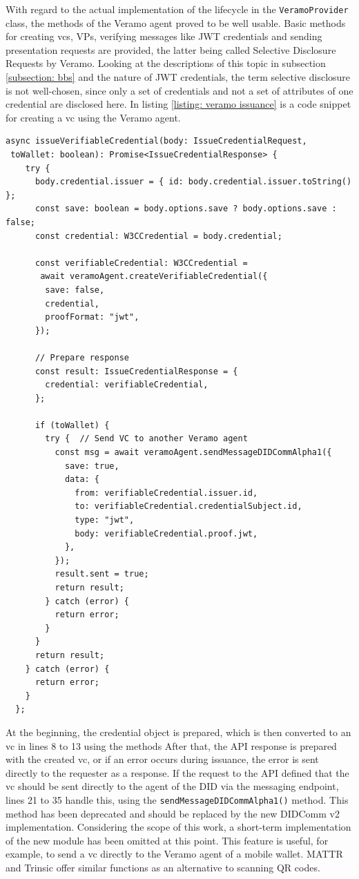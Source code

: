    With regard to the actual implementation of the lifecycle in the \texttt{VeramoProvider} class, the methods of the Veramo agent proved to be well usable. Basic methods for creating \acp{vc}, \acp{VP}, verifying messages like JWT credentials and sending presentation requests are provided, the latter being called Selective Disclosure Requests by Veramo. Looking at the descriptions of this topic in subsection \ref{subsection: bbs} and the nature of JWT credentials, the term selective disclosure is not well-chosen, since only a set of credentials and not a set of attributes of one credential are disclosed here. In listing \ref{listing: veramo issuance} is a code snippet for creating a \ac{vc} using the Veramo agent.
    \newline
        \begin{lstlisting}[style=ES6, caption=Issue a \ac{vc} with Veramo, label={listing: veramo issuance}]
async issueVerifiableCredential(body: IssueCredentialRequest, 
 toWallet: boolean): Promise<IssueCredentialResponse> {
    try {
      body.credential.issuer = { id: body.credential.issuer.toString() };
      const save: boolean = body.options.save ? body.options.save : false;
      const credential: W3CCredential = body.credential;
      
      const verifiableCredential: W3CCredential = 
       await veramoAgent.createVerifiableCredential({
        save: false,
        credential,
        proofFormat: "jwt",
      });

      // Prepare response
      const result: IssueCredentialResponse = {
        credential: verifiableCredential,
      };

      if (toWallet) {
        try {  // Send VC to another Veramo agent
          const msg = await veramoAgent.sendMessageDIDCommAlpha1({
            save: true,
            data: {
              from: verifiableCredential.issuer.id,
              to: verifiableCredential.credentialSubject.id,
              type: "jwt",
              body: verifiableCredential.proof.jwt,
            },
          });
          result.sent = true;
          return result;
        } catch (error) {
          return error;
        }
      }
      return result;
    } catch (error) {
      return error;
    }
  };\end{lstlisting}
    
    At the beginning, the credential object is prepared, which is then converted to an \ac{vc} in lines 8 to 13 using the methods After that, the API response is prepared with the created \ac{vc}, or if an error occurs during issuance, the error is sent directly to the requester as a response. If the request to the API defined that the \ac{vc} should be sent directly to the agent of the DID via the messaging endpoint, lines 21 to 35 handle this, using the \texttt{sendMessageDIDCommAlpha1()} method. This method has been deprecated and should be replaced by the new DIDComm v2 implementation. Considering the scope of this work, a short-term implementation of the new module has been omitted at this point. This feature is useful, for example, to send a \ac{vc} directly to the Veramo agent of a mobile wallet. MATTR and Trinsic offer similar functions as an alternative to scanning QR codes.
    
